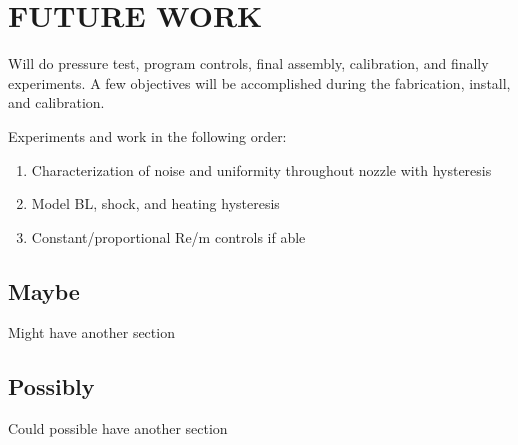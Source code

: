 %
%  
%

\chapter{FUTURE WORK}

Will do pressure test, program controls, final assembly, calibration, and finally experiments. A few objectives will be accomplished during the fabrication, install, and calibration.

Experiments and work in the following order:
\begin{enumerate}
    \item Characterization of noise and uniformity throughout nozzle with hysteresis
    \item Model BL, shock, and heating hysteresis
    \item Constant/proportional Re/m controls if able
\end{enumerate}

\section{Maybe}

Might have another section

\section{Possibly}

Could possible have another section


\nocite{anderson-fundamentals}
\nocite{anderson-compressible}
